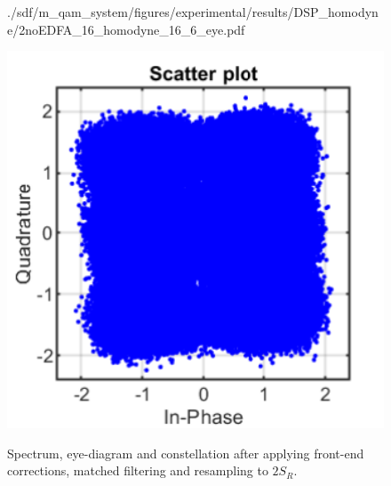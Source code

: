 \begin{figure}[H]
\begin{minipage}{0.30\textwidth}
			{./sdf/m_qam_system/figures/experimental/results/DSP_homodyne/2noEDFA_16_homodyne_16_6_eye.pdf}
			\label{fig:16GBdSpecMF}
		\end{minipage}
		\begin{minipage}{0.30\textwidth}
			\centering
			\includegraphics[width=1\textwidth]
			{./sdf/m_qam_system/figures/experimental/results/DSP_homodyne/2noEDFA_16_homodyne_16_6_const.pdf}\\
			\label{fig:16GBdSpecBefFec}
		\end{minipage}
		\caption{Spectrum, eye-diagram and constellation after applying front-end corrections, matched filtering and resampling to $2 S_R$.}
		\label{fig:16GBMFHm}
	\end{figure}


